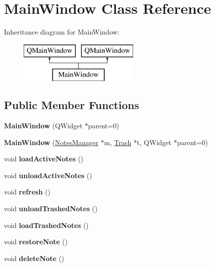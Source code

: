 \hypertarget{class_main_window}{}\section{Main\+Window Class Reference}
\label{class_main_window}
Inheritance diagram for Main\+Window\+:\begin{figure}[H]
\begin{center}
\leavevmode
\includegraphics[height=2.000000cm]{class_main_window}
\end{center}
\end{figure}
\subsection*{Public Member Functions}
\begin{DoxyCompactItemize}
\item 
\mbox{\label{class_main_window_a8b244be8b7b7db1b08de2a2acb9409db}} 
{\bfseries Main\+Window} (Q\+Widget $\ast$parent=0)
\item 
\mbox{\label{class_main_window_a15dd15d76c5b7e9ef6078dca836da2e9}} 
{\bfseries Main\+Window} (\hyperlink{class_notes_manager}{Notes\+Manager} $\ast$m, \hyperlink{class_trash}{Trash} $\ast$t, Q\+Widget $\ast$parent=0)
\item 
\mbox{\label{class_main_window_a5fe2f79d1669b8404a059542ecaf011b}} 
void {\bfseries load\+Active\+Notes} ()
\item 
\mbox{\label{class_main_window_aebff467c9b6fc051e2f77546a100f3e5}} 
void {\bfseries unload\+Active\+Notes} ()
\item 
\mbox{\label{class_main_window_ab27297114529e4c16d6d8d7a54927a0e}} 
void {\bfseries refresh} ()
\item 
\mbox{\label{class_main_window_aca9c0a991a4a3591d9e705442fb06adc}} 
void {\bfseries unload\+Trashed\+Notes} ()
\item 
\mbox{\label{class_main_window_aef33129c84ee03ef6e7070712e6de651}} 
void {\bfseries load\+Trashed\+Notes} ()
\item 
\mbox{\label{class_main_window_aecb2d69ac160ebf1db460d6854b14182}} 
void {\bfseries restore\+Note} ()
\item 
\mbox{\label{class_main_window_a3a169e9346099a7a81aa2d3bee01525d}} 
void {\bfseries delete\+Note} ()
\end{DoxyCompactItemize}


